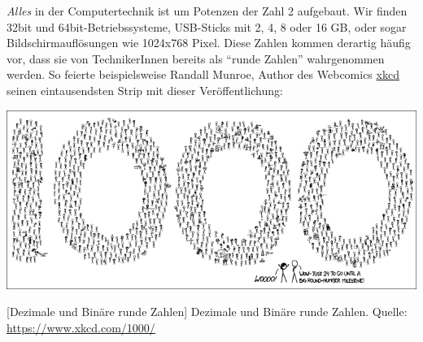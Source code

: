 \begin{hintbox}
\emph{Alles} in der Computertechnik ist um Potenzen der Zahl 2 aufgebaut. Wir finden 32bit und 64bit-Betriebssysteme, USB-Sticks mit 2, 4, 8 oder 16 GB, oder sogar Bildschirmauflösungen wie 1024x768 Pixel. Diese Zahlen kommen derartig häufig vor, dass sie von TechnikerInnen bereits als \enquote{runde Zahlen} wahrgenommen werden. So feierte beispielsweise Randall Munroe, Author des Webcomics \href{https://www.xkcd.com/}{xkcd} seinen eintausendsten Strip mit dieser Veröffentlichung:

\begin{center}
\includegraphics[width=.9\linewidth]{./gfx/xkcd-1000}
\end{center}
	[Dezimale und Binäre runde Zahlen]
	{Dezimale und Binäre runde Zahlen. Quelle: \url{https://www.xkcd.com/1000/}}
\end{hintbox}